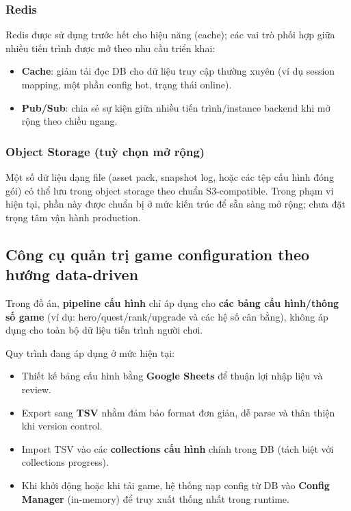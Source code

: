 \subsubsection{Redis}

Redis được sử dụng trước hết cho hiệu năng (cache); các vai trò phối hợp giữa nhiều tiến trình được mở theo nhu cầu triển khai\cite{redis-in-action}:
\begin{itemize}
    \item \textbf{Cache}: giảm tải đọc DB cho dữ liệu truy cập thường xuyên (ví dụ session mapping, một phần config hot, trạng thái online).
    \item \textbf{Pub/\allowbreak Sub}: chia sẻ sự kiện giữa nhiều tiến trình/\allowbreak instance backend khi mở rộng theo chiều ngang.
\end{itemize}

\subsubsection{Object Storage (tuỳ chọn mở rộng)}

Một số dữ liệu dạng file (asset pack, snapshot log, hoặc các tệp cấu hình đóng gói) có thể lưu trong object storage theo chuẩn S3-compatible. Trong phạm vi hiện tại, phần này được chuẩn bị ở mức kiến trúc để sẵn sàng mở rộng; chưa đặt trọng tâm vận hành production.

\subsection{Công cụ quản trị game configuration theo hướng data-driven}

Trong đồ án, \textbf{pipeline cấu hình} chỉ áp dụng cho \textbf{các bảng cấu hình/\allowbreak thông số game} (ví dụ: hero/\allowbreak quest/\allowbreak rank/\allowbreak upgrade và các hệ số cân bằng), không áp dụng cho toàn bộ dữ liệu tiến trình người chơi.

Quy trình đang áp dụng ở mức hiện tại:
\begin{itemize}
    \item Thiết kế bảng cấu hình bằng \textbf{Google Sheets} để thuận lợi nhập liệu và review.
    \item Export sang \textbf{TSV} nhằm đảm bảo format đơn giản, dễ parse và thân thiện khi version control.
    \item Import TSV vào các \textbf{collections cấu hình} chính trong DB (tách biệt với collections progress).
    \item Khi khởi động hoặc khi tải game, hệ thống nạp config từ DB vào \textbf{Config Manager} (in-memory) để truy xuất thống nhất trong runtime.
\end{itemize}

